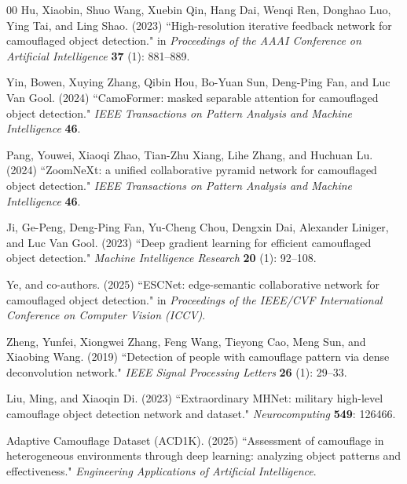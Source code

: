 \documentclass[3p,times,procedia]{elsarticle}
\begin{document}
\begin{thebibliography}{00}
{H}u, Xiaobin, Shuo Wang, Xuebin Qin, Hang Dai, Wenqi Ren, Donghao Luo, Ying Tai, and Ling Shao. (2023) ``High-resolution iterative feedback network for camouflaged object detection." in {\it Proceedings of the AAAI Conference on Artificial Intelligence} {\bf 37} (1): 881--889.

{Y}in, Bowen, Xuying Zhang, Qibin Hou, Bo-Yuan Sun, Deng-Ping Fan, and Luc Van Gool. (2024) ``CamoFormer: masked separable attention for camouflaged object detection." {\it IEEE Transactions on Pattern Analysis and Machine Intelligence} {\bf 46}.

{P}ang, Youwei, Xiaoqi Zhao, Tian-Zhu Xiang, Lihe Zhang, and Huchuan Lu. (2024) ``ZoomNeXt: a unified collaborative pyramid network for camouflaged object detection." {\it IEEE Transactions on Pattern Analysis and Machine Intelligence} {\bf 46}.

{J}i, Ge-Peng, Deng-Ping Fan, Yu-Cheng Chou, Dengxin Dai, Alexander Liniger, and Luc Van Gool. (2023) ``Deep gradient learning for efficient camouflaged object detection." {\it Machine Intelligence Research} {\bf 20} (1): 92--108.

{Y}e, and co-authors. (2025) ``ESCNet: edge-semantic collaborative network for camouflaged object detection." in {\it Proceedings of the IEEE/CVF International Conference on Computer Vision (ICCV)}.

{Z}heng, Yunfei, Xiongwei Zhang, Feng Wang, Tieyong Cao, Meng Sun, and Xiaobing Wang. (2019) ``Detection of people with camouflage pattern via dense deconvolution network." {\it IEEE Signal Processing Letters} {\bf 26} (1): 29--33.

{L}iu, Ming, and Xiaoqin Di. (2023) ``Extraordinary MHNet: military high-level camouflage object detection network and dataset." {\it Neurocomputing} {\bf 549}: 126466.

{A}daptive Camouflage Dataset (ACD1K). (2025) ``Assessment of camouflage in heterogeneous environments through deep learning: analyzing object patterns and effectiveness." {\it Engineering Applications of Artificial Intelligence}.


\end{thebibliography}
\end{document}
